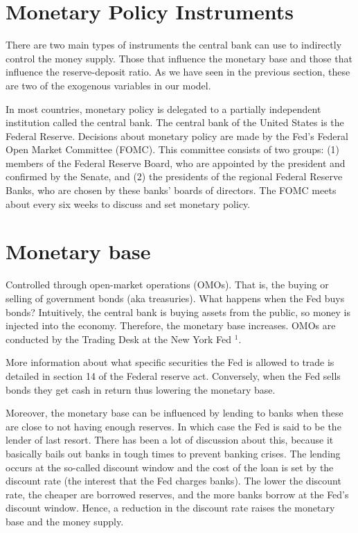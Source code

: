 \documentclass[10pt]{article}
\begin{document}
\section*{Monetary Policy Instruments}
There are two main types of instruments the central bank can use to indirectly control the money supply. Those that influence the monetary base and those that influence the reserve-deposit ratio. As we have seen in the previous section, these are two of the exogenous variables in our model.

In most countries, monetary policy is delegated to a partially independent institution called the central bank. The central bank of the United States is the Federal Reserve. Decisions about monetary policy are made by the Fed's Federal Open Market Committee (FOMC). This committee consists of two groups: (1) members of the Federal Reserve Board, who are appointed by the president and confirmed by the Senate, and (2) the presidents of the regional Federal Reserve Banks, who are chosen by these banks' boards of directors. The FOMC meets about every six weeks to discuss and set monetary policy.

\section*{Monetary base}
Controlled through open-market operations (OMOs). That is, the buying or selling of government bonds (aka treasuries). What happens when the Fed buys bonds? Intuitively, the central bank is buying assets from the public, so money is injected into the economy. Therefore, the monetary base increases. OMOs are conducted by the Trading Desk at the New York Fed ${ }^{1}$.

More information about what specific securities the Fed is allowed to trade is detailed in section 14 of the Federal reserve act. Conversely, when the Fed sells bonds they get cash in return thus lowering the monetary base.

Moreover, the monetary base can be influenced by lending to banks when these are close to not having enough reserves. In which case the Fed is said to be the lender of last resort. There has been a lot of discussion about this, because it basically bails out banks in tough times to prevent banking crises. The lending occurs at the so-called discount window and the cost of the loan is set by the discount rate (the interest that the Fed charges banks). The lower the discount rate, the cheaper are borrowed reserves, and the more banks borrow at the Fed's discount window. Hence, a reduction in the discount rate raises the monetary base and the money supply.
\end{document}
